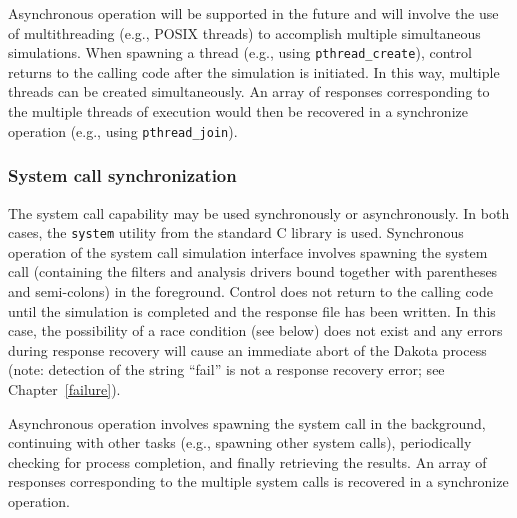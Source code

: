 Asynchronous operation will be supported in the future and will
involve the use of multithreading (e.g., POSIX threads) to accomplish
multiple simultaneous simulations. When spawning a thread (e.g., using
\texttt{pthread\_create}), control returns to the calling code after
the simulation is initiated. In this way, multiple threads can be
created simultaneously. An array of responses corresponding to the
multiple threads of execution would then be recovered in a synchronize
operation (e.g., using \texttt{pthread\_join}).

\subsubsection{System call synchronization}\label{parallel:SLP:local:system}

The system call capability may be used synchronously or
asynchronously. In both cases, the \texttt{system} utility from the
standard C library is used. Synchronous operation of the system call
simulation interface involves spawning the system call (containing
the filters and analysis drivers bound together with parentheses and
semi-colons) in the foreground. Control does not return to the calling
code until the simulation is completed and the response file has been
written. In this case, the possibility of a race condition (see below)
does not exist and any errors during response recovery will cause an
immediate abort of the Dakota process (note: detection of the string
``fail'' is not a response recovery error; see Chapter~\ref{failure}).

Asynchronous operation involves spawning the system call in the
background, continuing with other tasks (e.g., spawning other system
calls), periodically checking for process completion, and finally
retrieving the results. An array of responses corresponding to the
multiple system calls is recovered in a synchronize operation.

